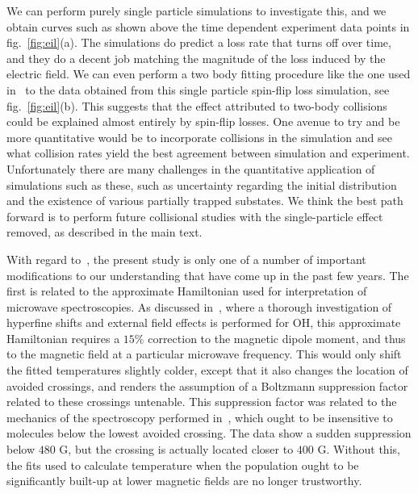 \documentclass[%
 reprint,
 amsmath,amssymb,
 aps,
prl,
]{revtex4-1}
\begin{document}
We can perform purely single particle simulations to investigate this, and we obtain curves such as shown above the time dependent experiment data points in fig.~\ref{fig:eil}(a).
The simulations do predict a loss rate that turns off over time, and they do a decent job matching the magnitude of the loss induced by the electric field.
We can even perform a two body fitting procedure like the one used in~\cite{Stuhl2013} to the data obtained from this single particle spin-flip loss simulation, see fig.~\ref{fig:eil}(b). 
This suggests that the effect attributed to two-body collisions could be explained almost entirely by spin-flip losses.
One avenue to try and be more quantitative would be to incorporate collisions in the simulation and see what collision rates yield the best agreement between simulation and experiment.
Unfortunately there are many challenges in the quantitative application of simulations such as these, such as uncertainty regarding the initial distribution and the existence of various partially trapped substates.
We think the best path forward is to perform future collisional studies with the single-particle effect removed, as described in the main text.

With regard to~\cite{Stuhl2012evap}, the present study is only one of a number of important modifications to our understanding that have come up in the past few years. 
The first is related to the approximate Hamiltonian used for interpretation of microwave spectroscopies. 
As discussed in~\cite{Maeda2015}, where a thorough investigation of hyperfine shifts and external field effects is performed for OH, this approximate Hamiltonian requires a $15\%$ correction to the magnetic dipole moment, and thus to the magnetic field at a particular microwave frequency. 
This would only shift the fitted temperatures slightly colder, except that it also changes the location of avoided crossings, and renders the assumption of a Boltzmann suppression factor related to these crossings untenable.
This suppression factor was related to the mechanics of the spectroscopy performed in~\cite{Stuhl2012evap}, which ought to be insensitive to molecules below the lowest avoided crossing.
The data show a sudden suppression below $480\text{ G}$, but the crossing is actually located closer to $400\text{ G}$.
Without this, the fits used to calculate temperature when the population ought to be significantly built-up at lower magnetic fields are no longer trustworthy. 
\end{document}
